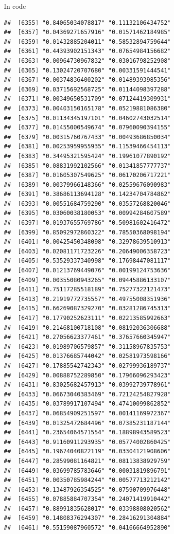 \documentclass[ignorenonframetext,]{beamer}
\begin{document}
\begin{frame}[fragile]{In code}
\begin{verbatim}
##  [6355] "0.84065034078817" "0.11132106434752"
##  [6357] "0.04369271657916" "0.01571462184985"
##  [6359] "0.01432885204011" "0.58532894759644"
##  [6361] "0.44393902151343" "0.07654984156682"
##  [6363] "0.00964730967832" "0.03016798252908"
##  [6365] "0.13024720707680" "0.00331591444541"
##  [6367] "0.00374836400202" "0.01489393985356"
##  [6369] "0.03715692568725" "0.01144098397288"
##  [6371] "0.00349650531709" "0.07124419309931"
##  [6373] "0.00403150165178" "0.05219881086380"
##  [6375] "0.01134345197101" "0.04602743032514"
##  [6377] "0.01455000549674" "0.07960090394155"
##  [6379] "0.00315760767433" "0.00493686850034"
##  [6381] "0.00253959955935" "0.11539466454113"
##  [6383] "0.34495321595424" "0.19961077890192"
##  [6385] "0.08831992102566" "0.01341857777737"
##  [6387] "0.01605307549625" "0.06170206717221"
##  [6389] "0.00379966148366" "0.02559676090983"
##  [6391] "0.38686113694128" "0.14234704784862"
##  [6393] "0.00551684759290" "0.03557268820046"
##  [6395] "0.03060038180053" "0.00994284607589"
##  [6397] "0.01937655769786" "0.50981602416472"
##  [6399] "0.85092972860322" "0.78550368098194"
##  [6401] "0.00425450348098" "0.32978639510913"
##  [6403] "0.02081171723226" "0.20649006358723"
##  [6405] "0.53529337340998" "0.17698447081117"
##  [6407] "0.01213769449076" "0.00199124753636"
##  [6409] "0.00355080943265" "0.09445886133107"
##  [6411] "0.75117285518189" "0.75277322121473"
##  [6413] "0.21919772735557" "0.49755008351936"
##  [6415] "0.66269087329270" "0.03281286745313"
##  [6417] "0.17790252623111" "0.02213585992663"
##  [6419] "0.21468100718108" "0.08192036306688"
##  [6421] "0.27056623377461" "0.37657660345947"
##  [6423] "0.01989706579857" "0.31158967835753"
##  [6425] "0.01376685744042" "0.02581973598166"
##  [6427] "0.17885542742343" "0.02799936189737"
##  [6429] "0.00888752289850" "0.17966096293423"
##  [6431] "0.83025682457913" "0.03992739778961"
##  [6433] "0.06673040383469" "0.72124254827928"
##  [6435] "0.03789917107494" "0.47410099862852"
##  [6437] "0.06854909251597" "0.00141169972367"
##  [6439] "0.01325472684496" "0.07385231187144"
##  [6441] "0.23654064571554" "0.18898943589523"
##  [6443] "0.91160911293935" "0.05774002860425"
##  [6445] "0.19674040822119" "0.03304121908606"
##  [6447] "0.28599081164821" "0.08113838929759"
##  [6449] "0.03699785783646" "0.00031819896791"
##  [6451] "0.00350785984244" "0.00577713212142"
##  [6453] "0.13487926354525" "0.07590709976448"
##  [6455] "0.07885884707354" "0.24071419910442"
##  [6457] "0.88991835628017" "0.03398808020562"
##  [6459] "0.14808376294307" "0.28416291304884"
##  [6461] "0.55159087960572" "0.04166664952890"

\end{verbatim}
\end{frame}
\end{document}
